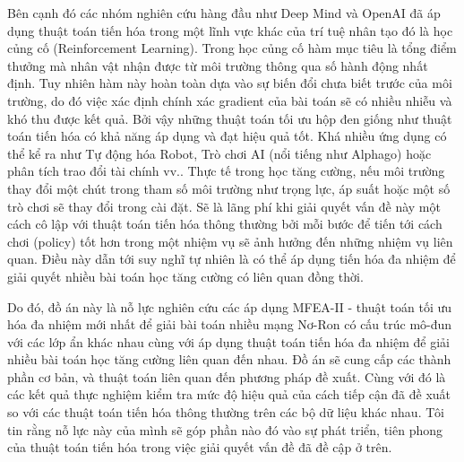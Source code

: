 Bên cạnh đó các nhóm nghiên cứu hàng đầu như Deep Mind và OpenAI đã áp dụng thuật toán tiến hóa trong một lĩnh vực khác của trí tuệ nhân tạo đó là học củng cố (Reinforcement Learning). Trong học củng cố hàm mục tiêu là tổng điểm thưởng mà nhân vật nhận được từ môi trường thông qua số hành động nhất định. Tuy nhiên hàm này hoàn toàn dựa vào sự biến đổi chưa biết trước của môi trường, do đó việc xác định chính xác gradient của bài toán sẽ có nhiều nhiễu và khó thu được kết quả. Bởi vậy những thuật toán tối ưu hộp đen giống như thuật toán tiến hóa có khả năng áp dụng và đạt hiệu quả tốt. Khá nhiều ứng dụng có thể kể ra như Tự động hóa Robot, Trò chơi AI (nổi tiếng như Alphago) hoặc phân tích trao đổi tài chính vv.. Thực tế trong học tăng cường, nếu môi trường thay đổi một chút trong tham số môi trường như trọng lực, áp suất hoặc một số trò chơi sẽ thay đổi trong cài đặt. Sẽ là lãng phí khi giải quyết vấn đề này một cách cô lập với thuật toán tiến hóa thông thường bởi mỗi bước để tiến tới cách chơi (policy) tốt hơn trong một nhiệm vụ sẽ ảnh hưởng đến những nhiệm vụ liên quan. Điều này dẫn tới suy nghĩ tự nhiên là có thể áp dụng tiến hóa đa nhiệm để giải quyết nhiều bài toán học tăng cường có liên quan đồng thời.


Do đó, đồ án này là nỗ lực nghiên cứu các áp dụng MFEA-II - thuật toán tối ưu hóa đa nhiệm mới nhất để giải bài toán nhiều mạng Nơ-Ron có cấu trúc mô-đun với các lớp ẩn khác nhau cùng với áp dụng thuật toán tiến hóa đa nhiệm để giải nhiều bài toán học tăng cường liên quan đến nhau.  Đồ án sẽ cung cấp các thành phần cơ bản, và thuật toán liên quan đến phương pháp đề xuất. Cùng với đó là các kết quả thực nghiệm kiểm tra mức độ hiệu quả của cách tiếp cận đã đề xuất so với các thuật toán tiến hóa thông thường trên các bộ dữ liệu khác nhau. Tôi tin rằng nỗ lực này của mình sẽ góp phần nào đó vào sự phát triển, tiên phong của thuật toán tiến hóa trong việc giải quyết vấn đề đã đề cập ở trên.

